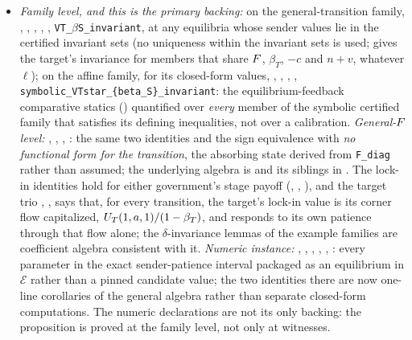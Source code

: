 \begin{itemize}[leftmargin=1.4em,itemsep=1pt]
\item \emph{Family level, and this is the primary backing:} on the general-transition family, , , , , , \texttt{VT\_$\beta$S\_invariant}, at any equilibria whose sender values lie in the certified invariant sets (no uniqueness within the invariant sets is used;  gives the target's invariance for members that share $F$, $\beta_T$, $-c$ and $n+v$, whatever $\ell$); on the affine family, for its closed-form values, , , , , \texttt{symbolic\_VTstar\_\{beta\_S\}\_invariant}: the equilibrium-feedback comparative statics () quantified over \emph{every} member of the symbolic certified family that satisfies its defining inequalities, not over a calibration. \emph{General-$F$ level:} , , , : the same two identities and the sign equivalence with \emph{no functional form for the transition}, the absorbing state derived from \texttt{F\_diag} rather than assumed; the underlying algebra is  and its siblings in . The lock-in identities hold for either government's stage payoff (, , ), and the target trio , ,  says that, for every transition, the target's lock-in value is its corner flow capitalized, $U_T(1,a,1)/(1-\beta_T)$, and responds to its own patience through that flow alone; the $\delta$-invariance lemmas of the example families are coefficient algebra consistent with it. \emph{Numeric instance:} , , , , , : every parameter in the exact sender-patience interval packaged as an equilibrium in $\mathcal E$ rather than a pinned candidate value; the two identities there are now one-line corollaries of the general algebra rather than separate closed-form computations. The numeric declarations are not its only backing: the proposition is proved at the family level, not only at witnesses.

\end{itemize}
